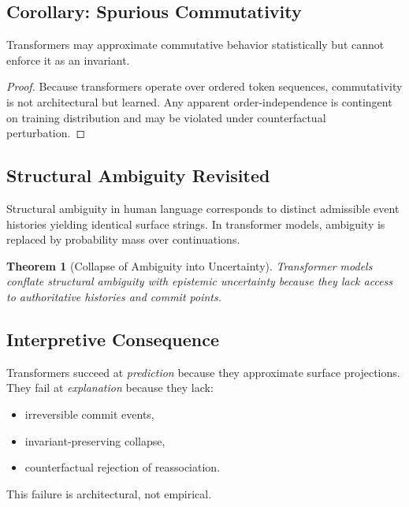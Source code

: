 \documentclass[11pt]{article}
\newtheorem{theorem}{Theorem}
\begin{document}
\subsection{Corollary: Spurious Commutativity}

\begin{corollary}
Transformers may approximate commutative behavior statistically but cannot enforce it as an invariant.
\end{corollary}


\begin{proof} Because transformers operate over ordered token sequences, commutativity is not architectural but learned. Any apparent order-independence is contingent on training distribution and may be violated under counterfactual perturbation. \end{proof}

\subsection{Structural Ambiguity Revisited}

Structural ambiguity in human language corresponds to distinct admissible event histories yielding identical surface strings. In transformer models, ambiguity is replaced by probability mass over continuations.

\begin{theorem}[Collapse of Ambiguity into Uncertainty] Transformer models conflate structural ambiguity with epistemic uncertainty because they lack access to authoritative histories and commit points. \end{theorem}

\subsection{Interpretive Consequence}

Transformers succeed at \emph{prediction} because they approximate surface projections. They fail at \emph{explanation} because they lack: \begin{itemize} \item irreversible commit events, \item invariant-preserving collapse, \item counterfactual rejection of reassociation. \end{itemize}

This failure is architectural, not empirical.
\end{document}
